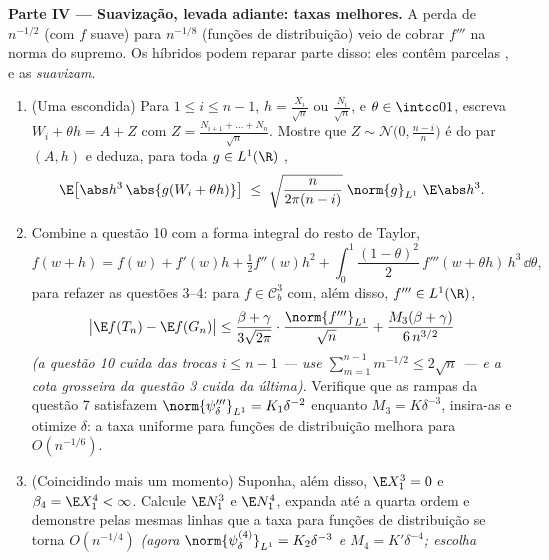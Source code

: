 \begin{problem}
\medskip
\noindent\textbf{Parte IV --- Suavização, levada adiante: taxas
melhores.} A perda de $n^{-1/2}$ (com $f$ suave) para $n^{-1/8}$ (funções de
distribuição) veio de cobrar $f'''$ na norma do supremo. Os híbridos
podem reparar parte disso: eles contêm parcelas , e as
 \emph{suavizam}.
\begin{enumerate}[resume]
  \item (Uma  escondida) Para $1 \leq i \leq n - 1$, $h =
        \frac{X_i}{\sqrt n}$ ou $\frac{N_i}{\sqrt n}$, e $\theta \in \intcc01$,
        escreva $W_i + \theta h = A +
        Z$ com $Z = \frac{N_{i+1} + \dots + N_n}{\sqrt
        n}$. Mostre que $Z \sim \mathcal N\bigl(0,
        \frac{n-i}n\bigr)$ é  do par
        $(A,
        h)$ e deduza, para toda $g \in
        L^1(\R)$ ,
        \[
        \E\bigl[\abs h^3\,\abs{g(W_i + \theta h)}\bigr]
        \;\leq\; \sqrt{\frac{n}{2\pi(n - i)}}\;
        \norm{g}_{L^1}\;\E\abs h^3 .
        \]
  \item Combine a questão 10 com a forma integral do resto de Taylor,
        \[
        f(w + h) = f(w) + f'(w)h + \tfrac12f''(w)h^2 +
        \int_0^1\frac{(1 - \theta)^2}2\,f'''(w + \theta
        h)\,h^3\,\dd\theta,
        \]
        para refazer as questões 3--4: para $f \in \mathcal C^3_b$ com, além disso,
        $f''' \in L^1(\R)$,
        \[
        \bigl|\E f(T_n) - \E f(G_n)\bigr| \leq
        \frac{\beta + \gamma}{3\sqrt{2\pi}}\cdot
        \frac{\norm{f'''}_{L^1}}{\sqrt n} +
        \frac{M_3(\beta + \gamma)}{6\,n^{3/2}}
        \]
        \emph{(a questão 10 cuida das trocas $i \leq n - 1$ --- use $\sum_{m=1}^{n-1}m^{-1/2} \leq 2\sqrt n$ --- e a
        cota grosseira da questão 3 cuida da última)}. Verifique que as
        rampas da questão 7 satisfazem $\norm{\psi_\delta'''}_{L^1} = K_1\delta^{-2}$ enquanto $M_3 = K\delta^{-3}$, insira-as e
        otimize $\delta$: a taxa uniforme para funções de
        distribuição melhora para $O(n^{-1/6})$.
  \item (Coincidindo mais um momento) Suponha, além disso, $\E
        X_1^3 = 0$ e
        $\beta_4 = \E X_1^4 < \infty$. Calcule $\E N_1^3$ e $\E N_1^4$, expanda até a quarta ordem e
        demonstre pelas mesmas linhas que a taxa para funções de
        distribuição se torna $O(n^{-1/4})$ \emph{(agora $\norm{\psi_\delta^{(4)}}_{L^1} =
        K_2\delta^{-3}$ e $M_4 = K'\delta^{-4}$; escolha
}
\end{enumerate}
\end{problem}
